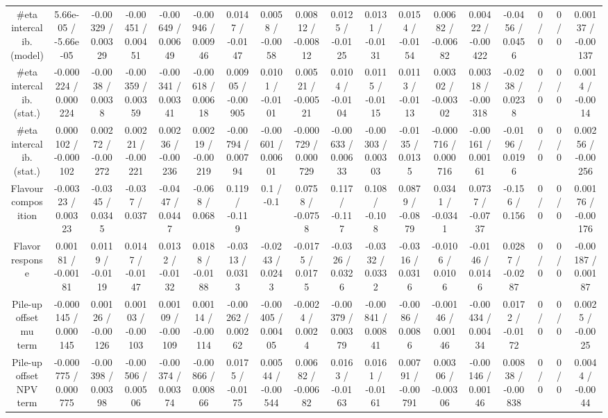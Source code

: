 \documentclass[10pt]{article}
\begin{document}
\begin{table}[htbp]
\begin{center}
\begin{tabular}{|c|c|c|c|c|c|c|c|c|c|c|c|c|c|c|c|c|c|}
  #eta intercalib. (model) & 5.66e-05 / -5.66e-05 & -0.00329 / 0.00329 & -0.00451 / 0.00451 & -0.00649 / 0.00649 & -0.00946 / 0.00946 & 0.0147 / -0.0147 & 0.0058 / -0.0058 & 0.00812 / -0.00812 & 0.0125 / -0.0125 & 0.0131 / -0.0131 & 0.0154 / -0.0154 & 0.00682 / -0.00682 & 0.00422 / -0.00422 & -0.0456 / 0.0456 & 0 / 0 & 0 / 0 & 0.00137 / -0.00137 \\ 
  #eta intercalib. (stat.) & -0.000224 / 0.000224 & -0.0038 / 0.0038 & -0.00359 / 0.00359 & -0.00341 / 0.00341 & -0.00618 / 0.00618 & 0.00905 / -0.00905 & 0.0101 / -0.0101 & 0.00521 / -0.00521 & 0.0104 / -0.0104 & 0.0115 / -0.0115 & 0.0113 / -0.0113 & 0.00302 / -0.00302 & 0.00318 / -0.00318 & -0.0238 / 0.0238 & 0 / 0 & 0 / 0 & 0.0014 / -0.0014 \\ 
  #eta intercalib. (stat.) & 0.000102 / -0.000102 & 0.00272 / -0.00272 & 0.00221 / -0.00221 & 0.00236 / -0.00236 & 0.00219 / -0.00219 & -0.00794 / 0.00794 & -0.00601 / 0.00601 & -0.000729 / 0.000729 & -0.00633 / 0.00633 & -0.00303 / 0.00303 & -0.0135 / 0.0135 & -0.000716 / 0.000716 & -0.00161 / 0.00161 & -0.0196 / 0.0196 & 0 / 0 & 0 / 0 & 0.00256 / -0.00256 \\ 
  Flavour composition & -0.00323 / 0.00323 & -0.0345 / 0.0345 & -0.037 / 0.037 & -0.0447 / 0.0447 & -0.068 / 0.068 & 0.119 / -0.119 & 0.1 / -0.1 & 0.0758 / -0.0758 & 0.117 / -0.117 & 0.108 / -0.108 & 0.0879 / -0.0879 & 0.0341 / -0.0341 & 0.0737 / -0.0737 & -0.156 / 0.156 & 0 / 0 & 0 / 0 & 0.00176 / -0.00176 \\ 
  Flavor response & 0.00181 / -0.00181 & 0.0119 / -0.0119 & 0.0147 / -0.0147 & 0.0132 / -0.0132 & 0.0188 / -0.0188 & -0.0313 / 0.0313 & -0.0243 / 0.0243 & -0.0175 / 0.0175 & -0.0326 / 0.0326 & -0.0332 / 0.0332 & -0.0316 / 0.0316 & -0.0106 / 0.0106 & -0.0146 / 0.0146 & 0.0287 / -0.0287 & 0 / 0 & 0 / 0 & -0.00187 / 0.00187 \\ 
  Pile-up offset mu term & -0.000145 / 0.000145 & 0.00126 / -0.00126 & 0.00103 / -0.00103 & 0.00109 / -0.00109 & 0.00114 / -0.00114 & -0.00262 / 0.00262 & -0.00405 / 0.00405 & -0.0024 / 0.0024 & -0.00379 / 0.00379 & -0.00841 / 0.00841 & -0.0086 / 0.0086 & -0.00146 / 0.00146 & -0.00434 / 0.00434 & 0.0172 / -0.0172 & 0 / 0 & 0 / 0 & 0.0025 / -0.0025 \\ 
  Pile-up offset NPV term & -0.000775 / 0.000775 & -0.00398 / 0.00398 & -0.00506 / 0.00506 & -0.00374 / 0.00374 & -0.00866 / 0.00866 & 0.0175 / -0.0175 & 0.00544 / -0.00544 & 0.00682 / -0.00682 & 0.0163 / -0.0163 & 0.0161 / -0.0161 & 0.00791 / -0.00791 & 0.00306 / -0.00306 & -0.00146 / 0.00146 & 0.00838 / -0.00838 & 0 / 0 & 0 / 0 & 0.0044 / -0.0044 \\ 

\end{tabular}
\end{center}
\end{table}
\end{document}
